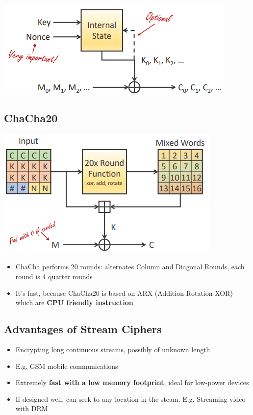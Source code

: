 \documentclass{article}
\begin{document}
\begin{center}
  \includegraphics[scale=0.5]{modern_cyphers.png}
\end{center}

\subsection{ChaCha20}

\begin{center}
  \includegraphics[scale=0.5]{chacha.png}
\end{center}
\begin{itemize}
  \item ChaCha performs 20 rounds: alternates Column and Diagonal Rounds, each round is 4 quarter rounds
  \item It's fast, because ChaCha20 is based on ARX (Addition-Rotation-XOR) which are \textbf{CPU friendly instruction}
\end{itemize}

\subsection{Advantages of Stream Ciphers}
\begin{itemize}
  \item Encrypting long continuous streams, possibly of unknown length 
  \item E.g. GSM mobile communications 
  \item Extremely \textbf{fast with a low memory footprint}, ideal for low-power devices 
  \item If designed well, can seek to any location in the steam. E.g. Streaming video with DRM
\end{itemize}
\end{document}
